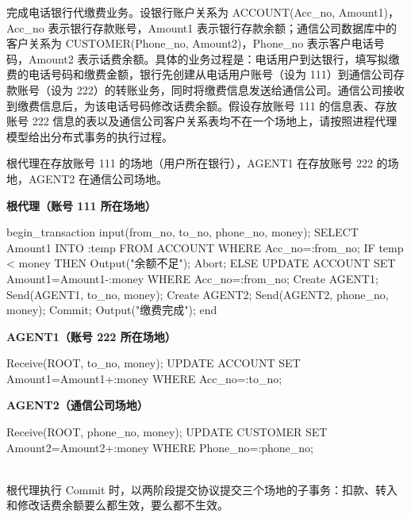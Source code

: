 \documentclass[10pt,a4paper]{article}
\newcommand{\zh}[1]{{\zhmono #1}}
\newenvironment{keep}{\par\noindent\begin{minipage}{\linewidth}\setlength{\parskip}{3pt plus 1pt}}{\end{minipage}\par\vspace{2pt}}
\begin{document}
\begin{keep}
\begin{prob}[2008 年第 3 题]
完成电话银行代缴费业务。设银行账户关系为 ACCOUNT(Acc\_no, Amount1)，Acc\_no 表示银行存款账号，Amount1 表示银行存款余额；通信公司数据库中的客户关系为 CUSTOMER(Phone\_no, Amount2)，Phone\_no 表示客户电话号码，Amount2 表示话费余额。具体的业务过程是：电话用户到达银行，填写拟缴费的电话号码和缴费金额，银行先创建从电话用户账号（设为 111）到通信公司存款账号（设为 222）的转账业务，同时将缴费信息发送给通信公司。通信公司接收到缴费信息后，为该电话号码修改话费余额。假设存放账号 111 的信息表、存放账号 222 信息的表以及通信公司客户关系表均不在一个场地上，请按照进程代理模型给出分布式事务的执行过程。
\end{prob}
\begin{ans}[2008 年第 3 题]
根代理在存放账号 111 的场地（用户所在银行），AGENT1 在存放账号 222 的场地，AGENT2 在通信公司场地。\\[1pt]
\begin{minipage}[t]{0.56\linewidth}
\textbf{根代理（账号 111 所在场地）}
\begin{code}
begin_transaction
 input(from_no, to_no, phone_no, money);
 SELECT Amount1 INTO :temp FROM ACCOUNT
   WHERE Acc_no=:from_no;
 IF temp < money THEN
   Output("\zh{余额不足}"); Abort;
 ELSE
   UPDATE ACCOUNT SET Amount1=Amount1-:money
     WHERE Acc_no=:from_no;
   Create AGENT1; Send(AGENT1, to_no, money);
   Create AGENT2; Send(AGENT2, phone_no, money);
   Commit;
   Output("\zh{缴费完成}");
end
\end{code}
\end{minipage}\hfill
\begin{minipage}[t]{0.42\linewidth}
\textbf{AGENT1（账号 222 所在场地）}
\begin{code}
Receive(ROOT, to_no, money);
UPDATE ACCOUNT
  SET Amount1=Amount1+:money
  WHERE Acc_no=:to_no;
\end{code}
\textbf{AGENT2（通信公司场地）}
\begin{code}
Receive(ROOT, phone_no, money);
UPDATE CUSTOMER
  SET Amount2=Amount2+:money
  WHERE Phone_no=:phone_no;
\end{code}
\end{minipage}\\[2pt]
根代理执行 Commit 时，以两阶段提交协议提交三个场地的子事务：扣款、转入和修改话费余额要么都生效，要么都不生效。
\end{ans}
\end{keep}
\end{document}
